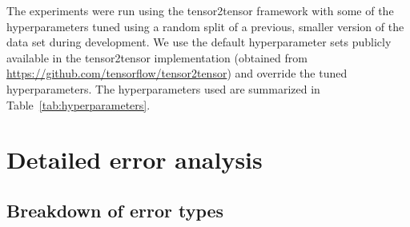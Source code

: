 \documentclass[letterpaper]{article}
\begin{document}
The experiments were run using the tensor2tensor framework \citep{tensor2tensor} with some of the hyperparameters tuned using a random split of a previous, smaller version of the data set during development. We use the default hyperparameter sets publicly available in the tensor2tensor implementation 
(obtained from \url{https://github.com/tensorflow/tensor2tensor})
and override the tuned hyperparameters. The hyperparameters used are
summarized in Table~\ref{tab:hyperparameters}.

\section{Detailed error analysis}
\label{suppl:error-analysis}

\subsection{Breakdown of error types}

\begin{table}[tb]
    \caption{Examples with a given error (in \%) of total test set size. See text for details.}
    \centering
    \label{tab:errors-detail}
\end{table}
\end{document}
